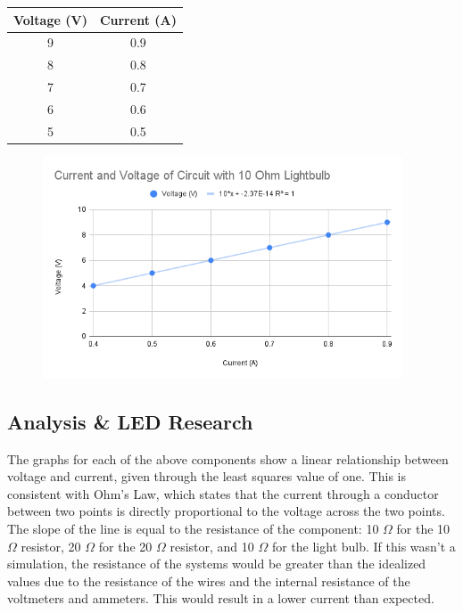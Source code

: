 \documentclass{report}
\begin{document}
\begin{table}[h]
\centering
\begin{tabular}{|c|c|}
\hline 
Voltage (V) & Current (A) \\
\hline 
9 & 0.9 \\
\hline 
8 & 0.8 \\
\hline 
7 & 0.7 \\
\hline 
6 & 0.6 \\
\hline 
5 & 0.5 \\
\hline

\end{tabular}
\end{table}

\begin{figure}[!ht]
  \begin{center}
    \includegraphics[width=0.95\textwidth]{figures/bulb.png}
  \end{center}
\end{figure}

\newpage

\subsection*{Analysis \& LED Research}

The graphs for each of the above components show a linear relationship between voltage and current, given through the least squares value of one. This is consistent with Ohm's Law, which states that the current through a conductor between two points is directly proportional to the voltage across the two points. The slope of the line is equal to the resistance of the component: 10 $\Omega$ for the 10 $\Omega$ resistor, 20 $\Omega$ for the 20 $\Omega$ resistor, and 10 $\Omega$ for the light bulb. If this wasn't a simulation, the resistance of the systems would be greater than the idealized values due to the resistance of the wires and the internal resistance of the voltmeters and ammeters. This would result in a lower current than expected. 
\end{document}
